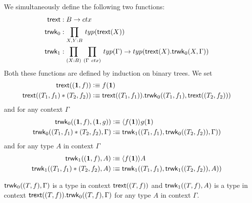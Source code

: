 We simultaneously define
the following two functions:
\begin{align*}
\trext & : B\to ctx\\
\trwk_0 & : \prd{X,Y:B} typ(\trext(X))\\
\trwk_1 & : \prd{X:B}{\Gamma~ctx} typ(\Gamma)\to typ(\ctxext{\trext(X)}{\trwk_0(X,\Gamma)})
\end{align*}
Both these functions are defined by induction on binary trees. We set
\begin{align*}
\trext((\unit,f)) & \defeq f(\unit)\\
\trext((T_1,f_1)*(T_2,f_2)) & \defeq \ctxext{\trext((T_1,f_1))}
{\trwk_0((T_1,f_1),\trext((T_2,f_2)))}
\end{align*}
and for any context $\Gamma$
\begin{align*}
\trwk_0((\unit,f),(\unit,g)) & \defeq \ctxwk{f(\unit)}{g(\unit)}\\
\trwk_0((T_1,f_1)*(T_2,f_2),\Gamma) 
  & \defeq \trwk_1((T_1,f_1),\trwk_0((T_2,f_2)),\Gamma))
\end{align*}
and for any type $A$ in context $\Gamma$
\begin{align*}
\trwk_1((\unit,f),A) & \defeq \ctxwk{f(\unit)}{A}\\
\trwk_1((T_1,f_1)*(T_2,f_2),A) & \defeq
  \trwk_1((T_1,f_1),\trwk_1((T_2,f_2)),A))
\end{align*}

\begin{lem}
$\mathsf{trwk}_0((T,f),\Gamma)$ is a type in context $\mathsf{trext}((T,f))$ and
$\mathsf{trwk}_1((T,f),A)$ is a type in context $\ctxext{\trext((T,f))}{\trwk_0((T,f),\Gamma)}$
for any type $A$ in context $\Gamma$.
\end{lem}


